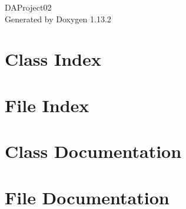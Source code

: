 \documentclass[twoside]{book}
\newcommand{\+}{\discretionary{\mbox{\scriptsize$\hookleftarrow$}}{}{}}
\newcommand{\clearemptydoublepage}{%
    \newpage{\pagestyle{empty}\cleardoublepage}%
  }
\begin{document}
  \raggedbottom
    \hypersetup{pageanchor=false,
                bookmarksnumbered=true,
                pdfencoding=unicode
               }
  \begin{titlepage}
  \vspace*{7cm}
  \begin{center}%
  {\Large DAProject02}\\
  \vspace*{1cm}
  {\large Generated by Doxygen 1.13.2}\\
  \end{center}
  \end{titlepage}
  \clearemptydoublepage
  \tableofcontents
  \clearemptydoublepage
  \hypersetup{pageanchor=true}
\chapter{Class Index}

\chapter{File Index}

\chapter{Class Documentation}



\chapter{File Documentation}


























  \backmatter
  \newpage
  \clearemptydoublepage
  \printindex
\end{document}
